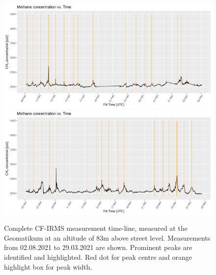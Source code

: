 \begin{figure}    
\centering
    \includegraphics[width=.8\textwidth]{figures/Appendix/CH4_Timelines/MediumPeakTimeline/4_CH4_Timeline8_Medium_Peaks Medium.jpeg}
    \includegraphics[width=.8\textwidth]{figures/Appendix/CH4_Timelines/MediumPeakTimeline/4_CH4_Timeline9_Medium_Peaks Medium.jpeg}
    \caption[Complete CF-IRMS time-line with prominent peaks highlighted]{Complete CF-IRMS measurement time-line, measured at the Geomatikum at an altitude of 83m above street level. Measurements from  02.08.2021 to 29.03.2021 are shown. Prominent peaks are identified and highlighted. Red dot for peak centre and orange highlight box for peak width.}
    \label{CompleteCF-IRMSTimeinePeaksAppendix}
\end{figure}

